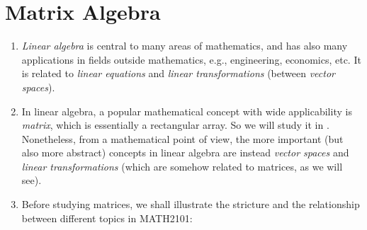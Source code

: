 \section{Matrix Algebra}
\label{sect:matrix-algebra}
\begin{enumerate}
\item \emph{Linear algebra} is central to many areas of mathematics, and has
also many applications in fields outside mathematics, e.g., engineering,
economics, etc. It is related to \emph{linear equations} and \emph{linear
transformations} (between \emph{vector spaces}).

\item In linear algebra, a popular mathematical concept with wide applicability
is \emph{matrix}, which is essentially a rectangular array. So we will study it
in . Nonetheless, from a mathematical point of view,
the more important (but also more abstract) concepts in linear algebra are
instead \emph{vector spaces} and \emph{linear transformations} (which are
somehow related to matrices, as we will see).

\item Before studying matrices, we shall illustrate the stricture and the
relationship between different topics in MATH2101:
\tikzexternaldisable
\begin{center}
\end{center}
\tikzexternalenable
\end{enumerate}
